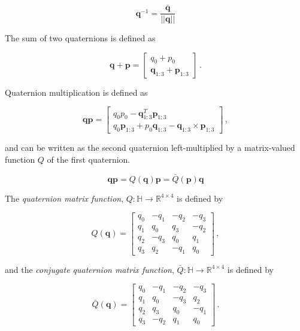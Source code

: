 \begin{equation}
	\mathbf{q}^{-1} = \frac{\bar{\mathbf{q}}}{||\mathbf{q}||}
\end{equation}

The sum of two quaternions is defined as

\begin{equation}
  \mathbf{q} + \mathbf{p} = \begin{bmatrix}
  	q_0 + p_0 \\ \mathbf{q}_{1:3} + \mathbf{p}_{1:3}
  \end{bmatrix}\,.
\end{equation}

Quaternion multiplication is defined as

\begin{equation}
  \mathbf{q} \mathbf{p} = \begin{bmatrix}
  	q_0 p_0 -\mathbf{q}^T_{1:3} \mathbf{p}_{1:3}\\
  	q_0 \mathbf{p}_{1:3} + p_0 \mathbf{q}_{1:3} - \mathbf{q}_{1:3} \times \mathbf{p}_{1:3}
  \end{bmatrix}\,,
\end{equation}

\noindent
and can be written as the second quaternion left-multiplied by a matrix-valued function $Q$ of the first quaternion.

\begin{equation}
  \mathbf{q} \mathbf{p} = Q(\mathbf{q}) \mathbf{p} = \bar{Q}(\mathbf{p}) \mathbf{q}
\end{equation}

\noindent
The \emph{quaternion matrix function}, $Q : \mathbb{H} \rightarrow \mathbb{R}^{4\times4}$ is defined by

\begin{equation}
	Q(\mathbf{q}) = \begin{bmatrix}
 q_0 & -q_1 & -q_2 & -q_3\\
 q_1 & q_0 & q_3 & -q_2\\
 q_2 & -q_3 & q_0 & q_1 \\
 q_3 & q_2 & -q_1 & q_0
\end{bmatrix}\,,
\end{equation}

\noindent
and the \emph{conjugate quaternion matrix function}, $\bar{Q} : \mathbb{H} \rightarrow \mathbb{R}^{4\times4}$ is defined by

\begin{equation}
	\bar{Q}(\mathbf{q}) = \begin{bmatrix}
 q_0 & -q_1 & -q_2 & -q_3\\
 q_1 & q_0 & -q_3 & q_2\\
 q_2 & q_3 & q_0 & -q_1 \\
 q_3 & -q_2 & q_1 & q_0
\end{bmatrix}\,.
\end{equation}




